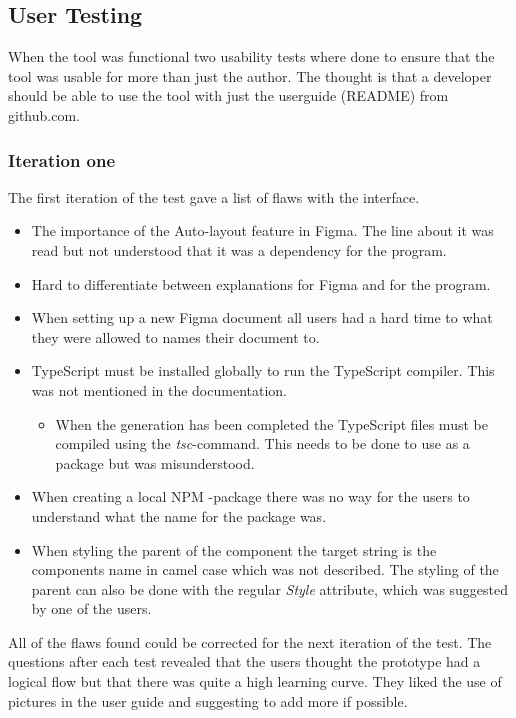 \subsection{User Testing}%
\label{sub:User Testing}
When the tool was functional two usability tests where done to ensure that the tool was usable for more than just the author. The thought is that a developer should be able to use the tool with just the userguide (README) from github.com.

\subsubsection{Iteration one}%
\label{ssub:Iteration one}
The first iteration of the test gave a list of flaws with the interface.
\begin{itemize}
   \item The importance of the Auto-layout feature in Figma. The line about it was read but not understood that it was a dependency for the program. 
   \item Hard to differentiate between explanations for Figma and for the program.
   \item When setting up a new Figma document all users had a hard time to what they were allowed to names their document to.
   \item TypeScript must be installed globally to run the TypeScript compiler. This was not mentioned in the documentation. 
      \begin{itemize}
         \item When the generation has been completed the TypeScript files must be compiled using the \textit{tsc}-command. This needs to be done to use as a package but was misunderstood.
      \end{itemize}
   \item When creating a local NPM -package there was no way for the users to understand what the name for the package was. 
   \item When styling the parent of the component the target string is the components name in camel case which was not described. The styling of the parent can also be done with the regular \textit{Style} attribute, which was suggested by one of the users.
\end{itemize}

All of the flaws found could be corrected for the next iteration of the test. The questions after each test revealed that the users thought the prototype had a logical flow but that there was quite a high learning curve. They liked the use of pictures in the user guide and suggesting to add more if possible.  

